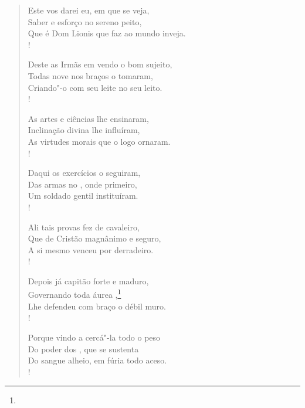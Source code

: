 \begin{verse}
Este vos darei eu, em que se veja,\\
Saber e esforço no sereno peito,\\
Que é Dom Lionis que faz ao mundo inveja.\\! %

Deste as Irmãs em vendo o bom sujeito,\\
Todas nove nos braços o tomaram,\\
Criando"-o com seu leite no seu leito.\\!

As artes e ciências lhe ensinaram,\\
Inclinação divina lhe influíram,\\
As virtudes morais que o logo ornaram.\\!
 
Daqui os exercícios o seguiram,\\
Das armas no , onde primeiro,\\
Um soldado gentil instituíram.\\!

Ali tais provas fez de cavaleiro,\\
Que de Cristão magnânimo e seguro,\\
A si mesmo venceu por derradeiro.\\!

Depois já capitão forte e maduro,\\
Governando toda áurea ,\footnote{}\\ %
Lhe defendeu com braço o débil muro.\\!

Porque vindo a cercá"-la todo o peso\\
Do poder dos , que se sustenta\\
Do sangue alheio, em fúria todo aceso.\\!


\end{verse}
